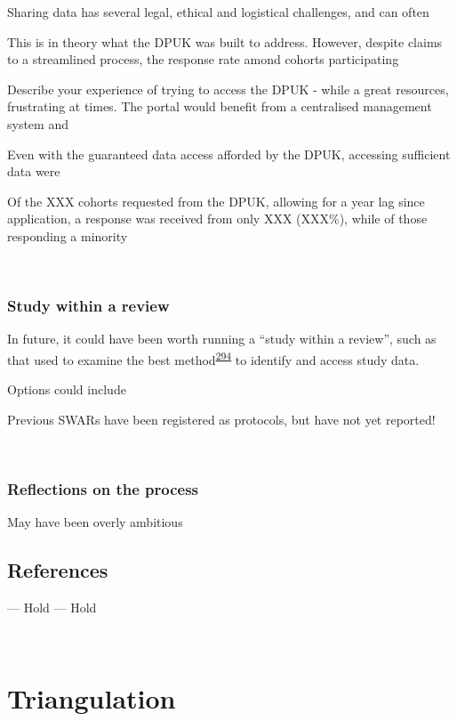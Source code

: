 \documentclass[a4paper, twoside]{templates/ociamthesis}
\begin{document}
Sharing data has several legal, ethical and logistical challenges, and can often

This is in theory what the DPUK was built to address. However, despite claims to a streamlined process, the response rate amond cohorts participating

Describe your experience of trying to access the DPUK - while a great resources, frustrating at times. The portal would benefit from a centralised management system and

Even with the guaranteed data access afforded by the DPUK, accessing sufficient data were

Of the XXX cohorts requested from the DPUK, allowing for a year lag since application, a response was received from only XXX (XXX\%), while of those responding a minority

~

\hypertarget{study-within-a-review}{%
\subsection{Study within a review}\label{study-within-a-review}}

In future, it could have been worth running a ``study within a review'', such as that used to examine the best method\textsuperscript{\protect\hyperlink{ref-godolphin2019a}{294}} to identify and access study data.

Options could include

Previous SWARs have been registered as protocols, but have not yet reported!

~

\hypertarget{reflections-on-the-process}{%
\subsection{Reflections on the process}\label{reflections-on-the-process}}

May have been overly ambitious

\newpage

\hypertarget{references-4}{%
\section{References}\label{references-4}}

--- Hold --- Hold

~

\hypertarget{tri-heading}{%
\chapter{Triangulation}\label{tri-heading}}
\end{document}
